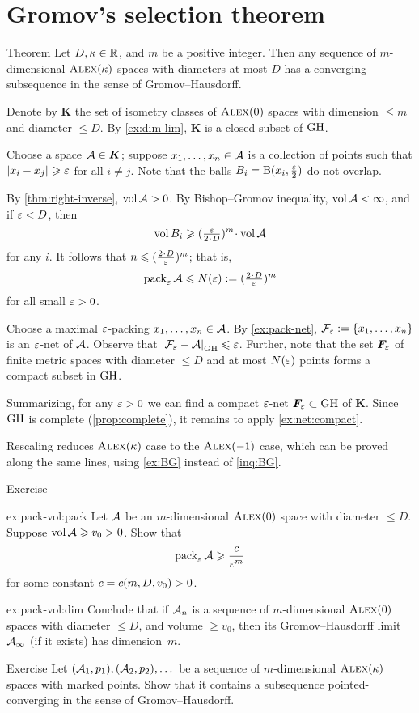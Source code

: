 \section{Gromov's selection theorem}

\begin{thm}{Theorem}\label{thm:gromov-compactness}
Let $D,\kappa\in\mathbb{R}$, and $m$ be a positive integer. 
Then any sequence of $m$-dimensional $\textsc{Alex}(\kappa)$ spaces with diameters at most $D$
has a converging subsequence in the sense of Gromov--Hausdorff.
\end{thm}

Denote by $\bm{K}$ the set of isometry classes of $\textsc{Alex}(0)$ spaces with dimension $\le m$ and diameter $\le D$.
By \ref{ex:dim-lim}, $\bm{K}$ is a closed subset of $\operatorname{\rm GH}\nolimits$.

Choose a space $\mathcal{A}\in \bm{K}$;
suppose $x_1,\dots,x_n\in \mathcal{A}$ is a collection of points such that $|{x_i}-{x_j}|_{}^{{}}\geqslant \varepsilon$ for all $i\ne j$.
Note that the balls $B_i=\mathrm{B}{}(x_i,\tfrac{\varepsilon}2)$ do not overlap.

By \ref{thm:right-inverse}, $\operatorname{\rm vol}\nolimits \mathcal{A}>0$.
By Bishop--Gromov inequality, $\operatorname{\rm vol}\nolimits \mathcal{A}<\infty$,
and if $\varepsilon<D$, then 
\[\vol B_i\ge (\tfrac\eps{2\cdot D})^m\cdot\vol \spc{A}\]
for any $i$.
It follows that $n\le (\tfrac{2\cdot D}\eps)^m$;
that is, 
\[\pack_\eps\spc{A}\le  N(\eps)\df(\tfrac{2\cdot D}\eps)^m\]
for all small $\varepsilon>0$.

Choose a maximal $\varepsilon$-packing $x_1,\dots,x_n\in \mathcal{A}$.
By \ref{ex:pack-net}, $\mathcal{F}_\varepsilon\mathrel{:=}\{x_1,\dots,x_n\}$ is an $\varepsilon$-net of $\mathcal{A}$.
Observe that $|{\mathcal{F}_\varepsilon}-{\mathcal{A}}|_{\operatorname{\rm GH}\nolimits}^{{}}\leqslant \varepsilon$.
Further, note that the set $\bm{F}_\varepsilon$ of finite metric spaces with diameter $\le D$ and at most $N(\varepsilon)$ points forms a compact subset in $\operatorname{\rm GH}\nolimits$.

Summarizing, for any $\varepsilon>0$ we can find a compact $\varepsilon$-net $\bm{F}_\varepsilon\subset \operatorname{\rm GH}\nolimits$ of $\bm{K}$.
Since $\operatorname{\rm GH}\nolimits$ is complete (\ref{prop:complete}), it remains to apply \ref{ex:net:compact}.

Rescaling reduces $\textsc{Alex}(\kappa)$ case to the $\textsc{Alex}(-1)$ case, which can be proved along the same lines, using \ref{ex:BG} instead of \ref{inq:BG}.
\qeds

\begin{thm}{Exercise}\label{ex:pack-vol}

\begin{subthm}{ex:pack-vol:pack}
Let $\mathcal{A}$ be an $m$-dimensional $\textsc{Alex}(0)$ space with diameter $\le D$.
Suppose $\operatorname{\rm vol}\nolimits\mathcal{A}\geqslant v_0>0$.
Show that 
\[\operatorname{\rm pack}\nolimits_\varepsilon\mathcal{A}\geqslant \frac{c}{\varepsilon^m}\]
for some constant $c=c(m,D,v_0)>0$.
\end{subthm}


\begin{subthm}{ex:pack-vol:dim}
Conclude that if $\mathcal{A}_n$ is a sequence of $m$-dimensional $\textsc{Alex}(0)$ spaces with diameter $\le D$, and volume $\ge v_0$, then its Gromov--Hausdorff limit $\mathcal{A}_\infty$ (if it exists) has dimension~$m$.
\end{subthm}
\end{thm}

\begin{thm}{Exercise}\label{ex:diam-compact:GH}
Let $(\mathcal{A}_1,p_1),(\mathcal{A}_2,p_2),\dots$ be a sequence of $m$-dimensional $\textsc{Alex}(\kappa)$ spaces with marked points.
Show that it contains a subsequence pointed-converging in the sense of Gromov--Hausdorff.

\end{thm}
